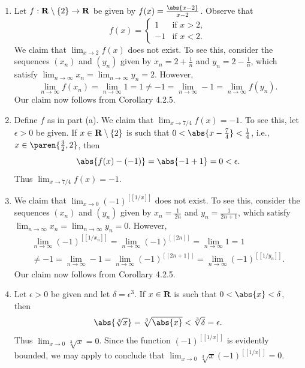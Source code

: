 \documentclass{lew98_solutions}
\begin{document}
\begin{solution}
    \begin{enumerate}
        \item Let \( f : \mathbf{R} \setminus \{ 2 \} \to \mathbf{R} \) be given by \( f(x) = \tfrac{\abs{x-2}}{x-2} \). Observe that
        \[
            f(x) = \begin{cases}
                1 & \text{if } x > 2, \\
                -1 & \text{if } x < 2.
            \end{cases}
        \]
        We claim that \( \lim_{x \to 2} f(x) \) does not exist. To see this, consider the sequences \( (x_n) \) and \( (y_n) \) given by \( x_n = 2 + \tfrac{1}{n} \) and \( y_n = 2 - \tfrac{1}{n} \), which satisfy \( \lim_{n \to \infty} x_n = \lim_{n \to \infty} y_n = 2 \). However,
        \[
            \lim_{n \to \infty} f(x_n) = \lim_{n \to \infty} 1 = 1 \neq -1 = \lim_{n \to \infty} -1 = \lim_{n \to \infty} f(y_n).
        \]
        Our claim now follows from Corollary 4.2.5.

        \item Define \( f \) as in part (a). We claim that \( \lim_{x \to 7/4} f(x) = -1 \). To see this, let \( \epsilon > 0 \) be given. If \( x \in \mathbf{R} \setminus \{ 2 \} \) is such that \( 0 < \abs{x - \tfrac{7}{4}} < \tfrac{1}{4} \), i.e., \( x \in \paren{ \tfrac{3}{2}, 2 } \), then
        \[
            \abs{f(x) - (-1)} = \abs{-1 + 1} = 0 < \epsilon.
        \]
        Thus \( \lim_{x \to 7/4} f(x) = -1 \).

        \item We claim that \( \lim_{x \to 0} (-1)^{[[1/x]]} \) does not exist. To see this, consider the sequences \( (x_n) \) and \( (y_n) \) given by \( x_n = \tfrac{1}{2n} \) and \( y_n = \tfrac{1}{2n+1} \), which satisfy \( \lim_{n \to \infty} x_n = \lim_{n \to \infty} y_n = 0 \). However,
        \begin{multline*}
            \lim_{n \to \infty} (-1)^{[[1/x_n]]} = \lim_{n \to \infty} (-1)^{[[2n]]} = \lim_{n \to \infty} 1 = 1 \\[2mm]
            \neq -1 = \lim_{n \to \infty} -1 = \lim_{n \to \infty} (-1)^{[[2n+1]]} = \lim_{n \to \infty} (-1)^{[[1/y_n]]}.
        \end{multline*}
        Our claim now follows from Corollary 4.2.5.

        \item Let \( \epsilon > 0 \) be given and let \( \delta = \epsilon^3 \). If \( x \in \mathbf{R} \) is such that \( 0 < \abs{x} < \delta \), then
        \[
            \abs{\sqrt[3]{x}} = \sqrt[3]{\abs{x}} < \sqrt[3]{\delta} = \epsilon.
        \]
        Thus \( \lim_{x \to 0} \sqrt[3]{x} = 0 \). Since the function \( (-1)^{[[1/x]]} \) is evidently bounded, we may apply  to conclude that \( \lim_{x \to 0} \sqrt[3]{x} (-1)^{[[1/x]]} = 0 \).
    \end{enumerate}
\end{solution}
\end{document}
